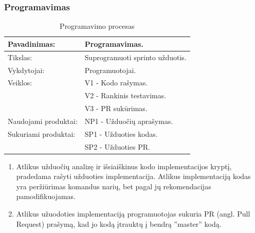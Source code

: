 \documentclass{VUMIFPSkursinis}
\begin{document}
	\subsubsection{Programavimas}
	\begin{center}
		\begin{table}[ht]
		\caption{Programavimo procesas}
		\begin{tabular}{ | l | l | } 
		\hline
		Pavadinimas:         & Programavimas.                      \\ \hline
		Tikslas: 	           & Suprogramuoti sprinto užduotis.      \\ \hline
		Vykdytojai:          & Programuotojai.                       \\ \hline
		Veiklos:             & V1 - Kodo rašymas. 									  \\
						             & V2 - Rankinis testavimas. 							 \\
					 	             & V3 - PR sukūrimas. \\ \hline
		Naudojami produktai: & NP1 - Užduočių aprašymas.								 \\ \hline
		Sukuriami produktai: & SP1 - Užduoties kodas. 							  		\\
												 & SP2 - Užduoties PR. \\ \hline
		\end{tabular}
	\end{table}
		\end{center}
		\begin{enumerate}
			\item Atlikus užduočių analizę ir išsiaiškinus kodo implementacijos kryptį, pradedama rašyti užduoties implementacija. Atlikus implementaciją kodas yra peržiūrimas komandus narių, bet pagal jų rekomendacijas pamodifikuojamas.
			\item Atlikus užuodoties implementaciją programuotojas sukuria PR (angl. Pull Request) prašymą, kad jo kodą įtrauktų į bendrą ''master'' kodą.
		\end{enumerate}
		
\end{document}
